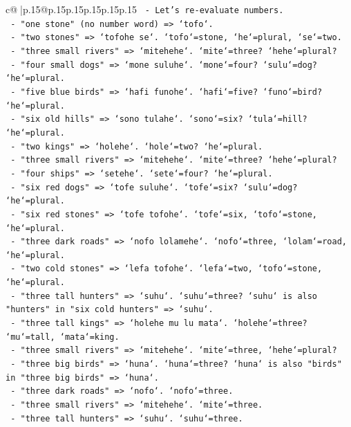 \documentclass{article}
\begin{document}
{\begin{supertabular}{c@{$\;$}|p{.15\linewidth}@{}p{.15\linewidth}p{.15\linewidth}p{.15\linewidth}p{.15\linewidth}p{.15\linewidth}}
{{{\texttt{    {-} Let's re{-}evaluate numbers.} \\
\texttt{      {-} "one stone" (no number word) => `tofo`.} \\
\texttt{      {-} "two stones" => `tofohe se`. `tofo`=stone, `he`=plural, `se`=two.} \\
\texttt{      {-} "three small rivers" => `mitehehe`. `mite`=three? `hehe`=plural?} \\
\texttt{      {-} "four small dogs" => `mone suluhe`. `mone`=four? `sulu`=dog? `he`=plural.} \\
\texttt{      {-} "five blue birds" => `hafi funohe`. `hafi`=five? `funo`=bird? `he`=plural.} \\
\texttt{      {-} "six old hills" => `sono tulahe`. `sono`=six? `tula`=hill? `he`=plural.} \\
\texttt{      {-} "two kings" => `holehe`. `hole`=two? `he`=plural.} \\
\texttt{      {-} "three small rivers" => `mitehehe`. `mite`=three? `hehe`=plural?} \\
\texttt{      {-} "four ships" => `setehe`. `sete`=four? `he`=plural.} \\
\texttt{      {-} "six red dogs" => `tofe suluhe`. `tofe`=six? `sulu`=dog? `he`=plural.} \\
\texttt{      {-} "six red stones" => `tofe tofohe`. `tofe`=six, `tofo`=stone, `he`=plural.} \\
\texttt{      {-} "three dark roads" => `nofo lolamehe`. `nofo`=three, `lolam`=road, `he`=plural.} \\
\texttt{      {-} "two cold stones" => `lefa tofohe`. `lefa`=two, `tofo`=stone, `he`=plural.} \\
\texttt{      {-} "three tall hunters" => `suhu`. `suhu`=three? `suhu` is also "hunters" in "six cold hunters" => `suhu`.} \\
\texttt{      {-} "three tall kings" => `holehe mu lu mata`. `holehe`=three? `mu`=tall, `mata`=king.} \\
\texttt{      {-} "three small rivers" => `mitehehe`. `mite`=three, `hehe`=plural?} \\
\texttt{      {-} "three big birds" => `huna`. `huna`=three? `huna` is also "birds" in "three big birds" => `huna`.} \\
\texttt{      {-} "three dark roads" => `nofo`. `nofo`=three.} \\
\texttt{      {-} "three small rivers" => `mitehehe`. `mite`=three.} \\
\texttt{      {-} "three tall hunters" => `suhu`. `suhu`=three.} \\
}}}
\end{supertabular}}
\end{document}
